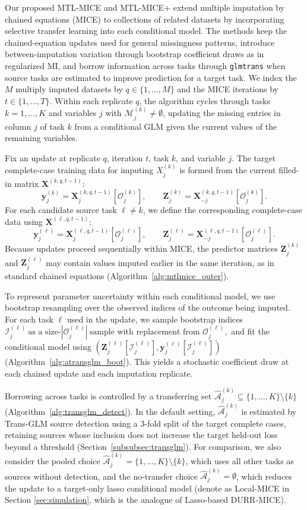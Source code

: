 \documentclass[12pt]{article}
\begin{document}
Our proposed MTL-MICE and MTL-MICE+ extend multiple imputation by chained equations (MICE) to collections of related datasets by incorporating selective transfer learning into each conditional model. The methods keep the chained-equation updates used for general missingness patterns, introduce between-imputation variation through bootstrap coefficient draws as in regularized MI, and borrow information across tasks through \texttt{glmtrans} when source tasks are estimated to improve prediction for a target task. We index the $M$ multiply imputed datasets by $q\in\{1,\dots,M\}$ and the MICE iterations by $t\in\{1,\dots,T\}$. Within each replicate $q$, the algorithm cycles through tasks $k=1,\dots,K$ and variables $j$ with $\mathcal{M}^{(k)}_j\neq\emptyset$, updating the missing entries in column $j$ of task $k$ from a conditional GLM given the current values of the remaining variables.

Fix an update at replicate $q$, iteration $t$, task $k$, and variable $j$. The target complete-case training data for imputing $X^{(k)}_j$ is formed from the current filled-in matrix $\bm{X}^{(k,q,t-1)}$:
\[
\bm{y}^{(k)}_{j}=\bm{X}^{(k,q,t-1)}_{j}[\mathcal{O}^{(k)}_j],\qquad
\bm{Z}^{(k)}_{j}=\bm{X}^{(k,q,t-1)}_{-j}[\mathcal{O}^{(k)}_j].
\]
For each candidate source task $\ell\neq k$, we define the corresponding complete-case data using $\bm{X}^{(\ell,q,t-1)}$:
\[
\bm{y}^{(\ell)}_{j}=\bm{X}^{(\ell,q,t-1)}_{j}[\mathcal{O}^{(\ell)}_j],\qquad
\bm{Z}^{(\ell)}_{j}=\bm{X}^{(\ell,q,t-1)}_{-j}[\mathcal{O}^{(\ell)}_j].
\]
Because updates proceed sequentially within MICE, the predictor matrices $\bm{Z}^{(k)}_j$ and $\bm{Z}^{(\ell)}_j$ may contain values imputed earlier in the same iteration, as in standard chained equations (Algorithm~\ref{alg:mtlmice_outer}).

To represent parameter uncertainty within each conditional model, we use bootstrap resampling over the observed indices of the outcome being imputed. For each task $\ell$ used in the update, we sample bootstrap indices
\(\mathcal{I}^{(\ell)}_{j}\ \text{as a size-}|\mathcal{O}^{(\ell)}_j|\ \text{sample with replacement from } \mathcal{O}^{(\ell)}_j,\)
and fit the conditional model using $(\bm{Z}^{(\ell)}_{j}[\mathcal{I}^{(\ell)}_{j}],\bm{y}^{(\ell)}_{j}[\mathcal{I}^{(\ell)}_{j}])$ (Algorithm~\ref{alg:atransglm_boot}). This yields a stochastic coefficient draw at each chained update and each imputation replicate.

Borrowing across tasks is controlled by a transferring set $\widehat{\mathcal{A}}^{(k)}_j\subseteq\{1,\dots,K\}\setminus\{k\}$ (Algorithm~\ref{alg:transglm_detect}). In the default setting, $\widehat{\mathcal{A}}^{(k)}_j$ is estimated by Trans-GLM source detection using a 3-fold split of the target complete cases, retaining sources whose inclusion does not increase the target held-out loss beyond a threshold (Section~\ref{subsubsec:transglm}). For comparison, we also consider the pooled choice $\widehat{\mathcal{A}}^{(k)}_j=\{1,\dots,K\}\setminus\{k\}$, which uses all other tasks as sources without detection, and the no-transfer choice $\widehat{\mathcal{A}}^{(k)}_j=\emptyset$, which reduces the update to a target-only lasso conditional model (denote as Local-MICE in Section \ref{sec:simulation}, which is the analogue of Lasso-based DURR-MICE).
\end{document}
